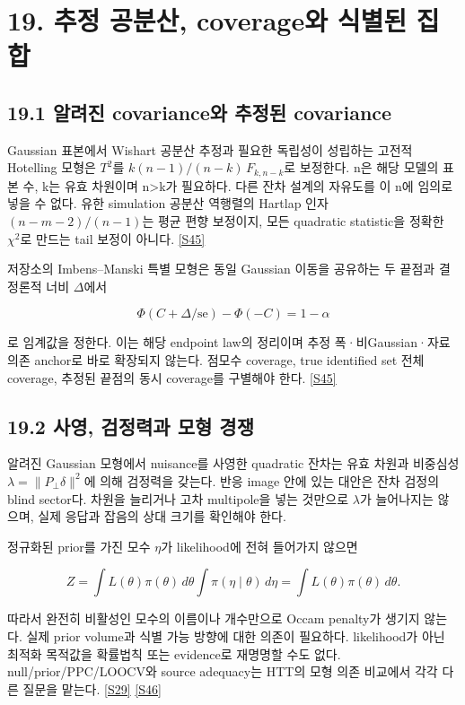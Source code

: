 \documentclass[11pt,a4paper]{article}
\begin{document}
\hypertarget{s19}{}

\section*{19. 추정 공분산, coverage와 식별된 집합}


\subsection*{19.1 알려진 covariance와 추정된 covariance}

Gaussian 표본에서 Wishart 공분산 추정과 필요한 독립성이 성립하는 고전적 Hotelling 모형은 \(T^2\)를 \(k(n-1)/(n-k)\,F_{k,n-k}\)로 보정한다. n은 해당 모델의 표본 수, k는 유효 차원이며 n>k가 필요하다. 다른 잔차 설계의 자유도를 이 n에 임의로 넣을 수 없다. 유한 simulation 공분산 역행렬의 Hartlap 인자 \((n-m-2)/(n-1)\)는 평균 편향 보정이지, 모든 quadratic statistic을 정확한 \(\chi^2\)로 만드는 tail 보정이 아니다. \hyperlink{src:S45}{[S45]}


저장소의 Imbens–Manski 특별 모형은 동일 Gaussian 이동을 공유하는 두 끝점과 결정론적 너비 \(\Delta\)에서


\[
\Phi(C+\Delta/\mathrm{se})-\Phi(-C)=1-\alpha
\]

로 임계값을 정한다. 이는 해당 endpoint law의 정리이며 추정 폭·비Gaussian·자료 의존 anchor로 바로 확장되지 않는다. 점모수 coverage, true identified set 전체 coverage, 추정된 끝점의 동시 coverage를 구별해야 한다. \hyperlink{src:S45}{[S45]}


\subsection*{19.2 사영, 검정력과 모형 경쟁}

알려진 Gaussian 모형에서 nuisance를 사영한 quadratic 잔차는 유효 차원과 비중심성 \(\lambda=\|P_\perp\delta\|^2\)에 의해 검정력을 갖는다. 반응 image 안에 있는 대안은 잔차 검정의 blind sector다. 차원을 늘리거나 고차 multipole을 넣는 것만으로 \(\lambda\)가 늘어나지는 않으며, 실제 응답과 잡음의 상대 크기를 확인해야 한다.


정규화된 prior를 가진 모수 \(\eta\)가 likelihood에 전혀 들어가지 않으면


\[
Z=\int L(\theta)\pi(\theta)\,d\theta
\int\pi(\eta\mid\theta)\,d\eta
=\int L(\theta)\pi(\theta)\,d\theta.
\]

따라서 완전히 비활성인 모수의 이름이나 개수만으로 Occam penalty가 생기지 않는다. 실제 prior volume과 식별 가능 방향에 대한 의존이 필요하다. likelihood가 아닌 최적화 목적값을 확률법칙 또는 evidence로 재명명할 수도 없다. null/prior/PPC/LOOCV와 source adequacy는 HTT의 모형 의존 비교에서 각각 다른 질문을 맡는다. \hyperlink{src:S29}{[S29]} \hyperlink{src:S46}{[S46]}
\end{document}
